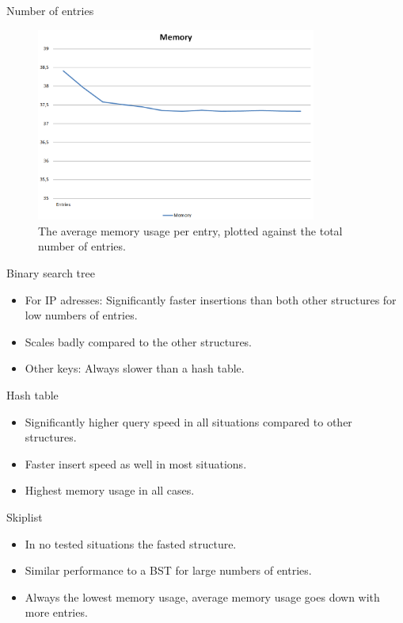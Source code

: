 \documentclass[10pt]{beamer}
\begin{document}
\begin{frame}{Number of entries}
    \begin{figure}
      \centering
        \includegraphics[width=0.82\textwidth]{SkiplistMemory}
      \caption{The average memory usage per entry, plotted against the total number of entries.}
    \end{figure}
\end{frame}

\begin{frame}{Binary search tree}
    \begin{itemize}
        \item For IP adresses: Significantly faster insertions than both other structures for low numbers of entries.
        \item Scales badly compared to the other structures.
        \item Other keys: Always slower than a hash table.
    \end{itemize}
\end{frame}

\begin{frame}{Hash table}
    \begin{itemize}
        \item Significantly higher query speed in all situations compared to other structures.
        \item Faster insert speed as well in most situations.
        \item Highest memory usage in all cases.
    \end{itemize}
\end{frame}

\begin{frame}{Skiplist}
    \begin{itemize}
        \item In no tested situations the fasted structure.
        \item Similar performance to a BST for large numbers of entries.
        \item Always the lowest memory usage, average memory usage goes down with more entries.
    \end{itemize}
\end{frame}
\end{document}

